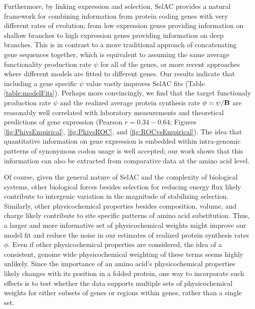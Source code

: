 \documentclass[onecolumn,letterpaper,fleqn,nogrid]{myMBE}%
\newcommand{\PC}{physicochemical\xspace}
\newcommand{\Func}{\ensuremath{\text{\textbf{B}}}\xspace}
\newcommand{\selac}{SelAC\xspace}
\begin{document}
Furthermore, by linking expression and selection, \selac provides a natural framework for combining information from protein coding genes with very different rates of evolution; from low expression genes providing information on shallow branches to high expression genes providing information on deep branches.
This is in contrast to a more traditional approach of concatenating gene sequences together, which is equivalent to assuming the same average functionality production rate $\psi$ for all of the genes, or more recent approaches where different models are fitted to different genes.
Our results indicate that including a gene specific $\psi$ value vastly improves \selac fits (Table \ref{table:modelFits}).
Perhaps more convincingly, we find that the target functionaly production rate $\psi$ and the realized average protein synthesis rate $\phi = \psi/\Func$ are reasonably well correlated with laboratory measurements and theoretical predictions of gene expression (Pearson $r= 0.34-0.64$; Figures \ref{fig:PhivsEmpirical}, \ref{fig:PhivsROC}, and \ref{fig:ROCvsEmpirical}).
The idea that quantitative information on gene expression is embedded within intra-genomic patterns of synonymous codon usage is well accepted; our work shows that this information can also be extracted from comparative data at the amino acid level.

Of course, given the general nature of \selac and the complexity of biological systems, other biological forces besides selection for reducing energy flux likely contribute to intergenic variation in the magnitude of stabilizing selection.
Similarly, other physicochemical properties besides composition, volume, and charge likely contribute to site specific patterns of amino acid substitution.
Thus, a larger and more informative set of \PC weights might improve our model fit and reduce the noise in our estimates of realized protein synthesis rates $\phi$.
Even if other physicochemical properties are considered, the idea of a consistent, genome wide \PC weighting of these terms seems highly unlikely.
Since the importance of an amino acid's physicochemical properties likely changes with its position in a folded protein, one way to incorporate such effects is to test whether the data supports multiple sets of \PC weights for either subsets of genes or regions within genes, rather than a single set.
\end{document}
